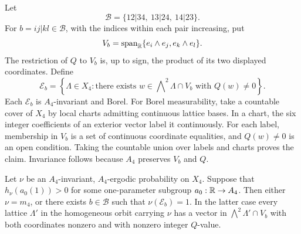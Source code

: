 Let
\[
 \mathcal B=\{12|34,\ 13|24,\ 14|23\}.
\]
For \(b=ij|kl\in\mathcal B\), with the indices within each pair
increasing, put
\begin{equation}\label{eq:rig-planes}
 V_b=\operatorname{span}_\mathbb R\{e_i\wedge e_j,e_k\wedge e_l\}.
\end{equation}
The restriction of \(Q\) to \(V_b\) is, up to sign, the product of
its two displayed coordinates.  Define
\begin{equation}\label{eq:rig-events}
 \mathcal E_b
 =\left\{\Lambda\in X_4:
   \text{there exists }w\in\bigwedge\nolimits^2\Lambda\cap V_b
   \text{ with }Q(w)\ne0\right\}.
\end{equation}
Each \(\mathcal E_b\) is \(A_4\)-invariant and Borel.
For Borel measurability, take a countable cover of \(X_4\) by local
charts admitting continuous lattice bases.  In a chart, the six
integer coefficients of an exterior vector label it continuously.
For each label, membership in \(V_b\) is a set of continuous
coordinate equalities, and \(Q(w)\ne0\) is an open condition.
Taking the countable union over labels and charts proves the claim.
Invariance follows because \(A_4\) preserves \(V_b\) and \(Q\).

\begin{proposition}
\label{prop:rig-obstruction}
Let \(\nu\) be an \(A_4\)-invariant, \(A_4\)-ergodic probability
on \(X_4\).  Suppose that \(h_\nu(a_0(1))>0\) for some
one-parameter subgroup \(a_0:\mathbb R\to A_4\).
Then either \(\nu=m_4\), or there exists
\(b\in\mathcal B\) such that \(\nu(\mathcal E_b)=1\).
In the latter case every lattice \(\Lambda'\) in the homogeneous orbit carrying
\(\nu\) has a vector in \(\bigwedge^2\Lambda'\cap V_b\) with both
coordinates nonzero and with nonzero integer \(Q\)-value.
\end{proposition}

